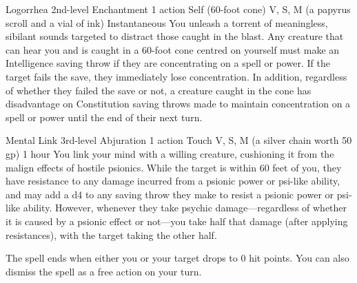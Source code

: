 \DndSpellHeader%
    {Logorrhea\label{spl:logorrhea}}
    {2nd-level Enchantment}
    {1 action}
    {Self (60-foot cone)}
    {V, S, M (a papyrus scroll and a vial of ink)}
    {Instantaneous}
You unleash a torrent of meaningless, sibilant sounds targeted
to distract those caught in the blast.
Any creature that can hear you and is
caught in a 60-foot cone centred on yourself must
make an Intelligence saving throw if they are concentrating on
a spell or power. If the target fails the save,
they immediately lose concentration. In addition,
regardless of whether they failed the save or not, a creature
caught in the cone has disadvantage on
Constitution saving throws made to maintain concentration on
a spell or power until the end of their next turn. 

\DndSpellHeader%
    {Mental Link\label{spl:mental_link}}
    {3rd-level Abjuration}
    {1 action}
    {Touch}
    {V, S, M (a silver chain worth 50 gp)}
    {1 hour}
You link your mind with a willing creature, cushioning it from
the malign effects of hostile psionics.
While the target is within 60 feet of you, they have resistance
to any damage incurred from a psionic power
or psi-like ability, and may add a d4 to any saving throw
they make to resist a psionic power or psi-like ability.
However, whenever they take psychic damage---regardless
of whether it is caused by a psionic effect
or not---you take half that damage (after applying resistances),
with the target taking the other half.

The spell ends when either you or your target drops to 0 hit points.
You can also dismiss the spell as a free action on your turn.

